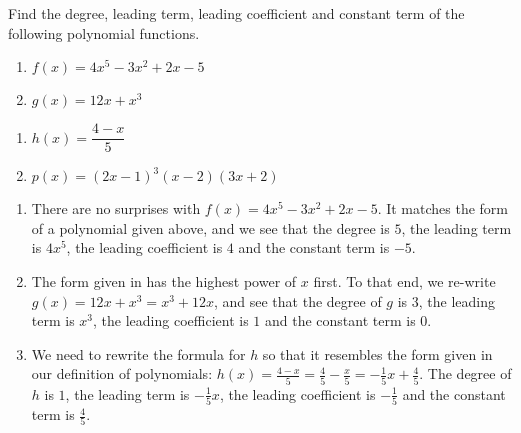 \documentclass{ximera}
\begin{document}
\begin{example}  
Find the degree, leading term, leading coefficient and constant term of the following polynomial functions.

\begin{multicols}{2}
\begin{enumerate}

\item  $f(x) = 4x^5 - 3x^2 + 2x - 5$
\item $g(x) = 12x +x^3$

\end{enumerate}
\end{multicols}

\begin{multicols}{2}
\begin{enumerate}

\item  $h(x) = \dfrac{4-x}{5}$
\item  $p(x) = (2x-1)^{3}(x-2)(3x+2)$ 

\end{enumerate}
\end{multicols}

\begin{explanation}

\begin{enumerate}

\item  There are no surprises with $f(x) = 4x^5 - 3x^2 + 2x - 5$.  It matches the form of a polynomial given above, and we see that the degree is $5$, the leading term is $4x^5$, the leading coefficient is $4$ and the constant term is $-5$.

\item The form given in  has the highest power of $x$ first.  To that end, we re-write $g(x) = 12x +x^3 = x^3+12x$, and see that the degree of $g$ is $3$, the leading term is $x^3$, the leading coefficient is $1$ and the constant term is $0$.

\item  We need to rewrite the formula for $h$ so that it resembles the form given in our definition of polynomials:  $h(x) = \frac{4-x}{5} = \frac{4}{5} - \frac{x}{5} = -\frac{1}{5} x + \frac{4}{5}$.  The degree of $h$ is $1$, the leading term is $-\frac{1}{5} x$, the leading coefficient is $-\frac{1}{5}$ and the constant term is $\frac{4}{5}$.


\end{enumerate}
\end{explanation}
\end{example}
\end{document}
